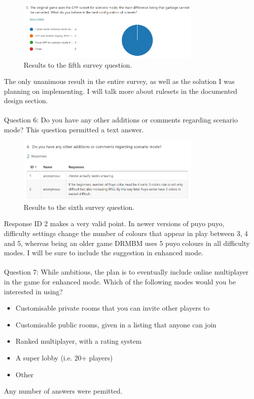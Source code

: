 \documentclass{article}
\begin{document}
\begin{figure}[h]
    \centering
    \includegraphics[width=0.8\textwidth]{survey5.png}
    \caption{\label{fig:survey5}Results to the fifth survey question.}
\end{figure}

The only unanimous result in the entire survey, as well as the solution I was planning on implementing. I will talk more about rulesets in the documented design section.
\\\\
Question 6: Do you have any other additions or comments regarding scenario mode?
This question permitted a text answer.

\begin{figure}[h]
    \centering
    \includegraphics[width=0.8\textwidth]{survey6.png}
    \caption{\label{fig:survey6}Results to the sixth survey question.}
\end{figure}

Response ID 2 makes a very valid point. In newer versions of puyo puyo, difficulty settings change the number of colours that appear in play between 3, 4 and 5, whereas being an older game DRMBM uses 5 puyo colours in all difficulty modes. I will be sure to include the suggestion in enhanced mode.
\\\\
Question 7: While ambitious, the plan is to eventually include online multiplayer in the game for enhanced mode. Which of the following modes would you be interested in using? 
\begin{itemize}
    \renewcommand\labelitemi{--}
    \item Customisable private rooms that you can invite other players to
    \item Customisable public rooms, given in a listing that anyone can join
    \item Ranked multiplayer, with a rating system
    \item A super lobby (i.e. 20+ players)
    \item Other
\end{itemize}
Any number of answers were pemitted.
\end{document}
